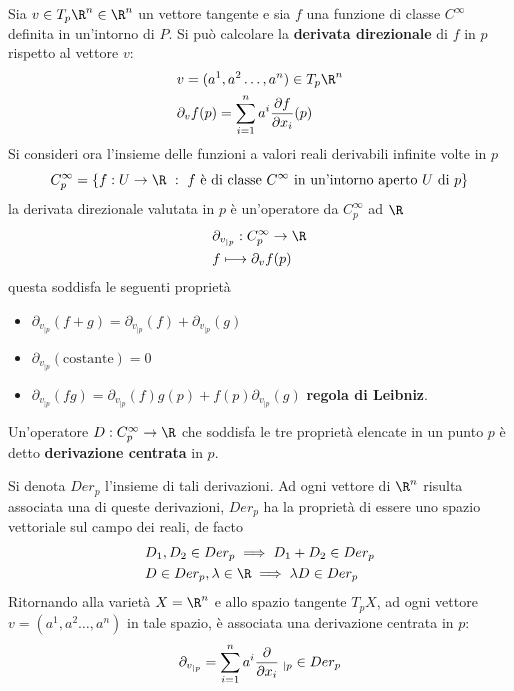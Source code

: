 \documentclass[10pt, letterpaper]{report}
\begin{document}
Sia $v\in T_p\R^n\in\R^n$ un vettore tangente e sia $f$ una funzione di classe $C^\infty$ definita in un'intorno di $P$.
Si può calcolare la \textbf{derivata direzionale} di $f$ in $p$ rispetto al vettore $v$:\begin{align}
    &v=(a^1,a^2\dots,a^n)\in T_p\R^n\\
    &\partial_vf(p)=\sum_{i=1}^n a^i\frac{\partial f}{\partial x_i}(p)
\end{align}
Si consideri ora l'insieme delle funzioni a valori reali derivabili infinite volte in $p$\begin{equation}
    C_p^\infty=\{f:U\rightarrow\R \ : \ f\text{ è di classe }C^\infty \text{ in un'intorno aperto }U\text{ di }p\}
\end{equation}
la derivata direzionale valutata in $p$ è un'operatore da $ C_p^\infty$ ad $\R$\begin{align}
    &\partial_{v_{|p}}: C_p^\infty\rightarrow\R\\ 
    &f\longmapsto \partial_vf(p)
\end{align}
questa soddisfa le seguenti proprietà\begin{itemize}
    \item $\partial_{v_{|p}}(f+g)=\partial_{v_{|p}}(f)+\partial_{v_{|p}}(g)$
    \item $\partial_{v_{|p}}(\text{costante})=0$
    \item $\partial_{v_{|p}}(fg)=\partial_{v_{|p}}(f)g(p)+f(p)\partial_{v_{|p}}(g)$ \textbf{regola di Leibniz}.
\end{itemize}
\begin{definizione}
    Un'operatore $D: C_p^\infty\rightarrow\R$ che soddisfa le tre proprietà elencate in un punto $p$ è detto \textbf{derivazione centrata} in $p$.
\end{definizione}
Si denota $Der_p$ l'insieme di tali derivazioni. Ad ogni vettore di $\R^n$ risulta associata una di queste derivazioni, $Der_p$ ha la proprietà di essere uno spazio vettoriale sul campo dei reali, de facto \begin{align}
    &D_1,D_2\in Der_p\implies D_1+D_2\in Der_p\\ 
    & D\in Der_p,\lambda\in\R\implies \lambda D\in Der_p
\end{align}
Ritornando alla varietà $X=\R^n$ e allo spazio tangente $T_pX$, ad ogni vettore $v=(a^1,a^2\dots,a^n)$ in tale spazio, è associata una derivazione centrata in $p$:\begin{equation}
    \partial_{v_{|p}}={\sum_{i=1}^n a^i\frac{\partial }{\partial x_i}}\hphantom{.}_{|p}\in Der_p
\end{equation}
\end{document}
